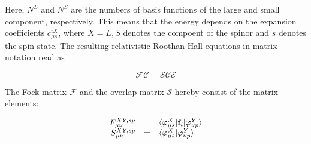 Here, $N^L$ and $N^S$ are the numbers of basis functions of the large and small
component, respectively. This means that the energy depends on the expansion
coefficients $c_{\mu s}^{iX}$, where $X=L,S$ denotes the compoent of the spinor and
$s$ denotes the spin state. The resulting relativistic Roothan-Hall equations
in matrix notation read as

\begin{equation}
\mathcal{FC} = \mathcal{SCE}
\end{equation}

The Fock matrix $\mathcal{F}$ and the overlap matrix $\mathcal{S}$
hereby consist of the matrix elements:

\begin{equation}\begin{array}{rcl}\label{roothanm}
F^{XY,sp}_{\mu\nu} &=& \braket{\varphi^X_{\mu s}|\mathbf{f}_i|\varphi_{\nu p}^Y}\\
S^{XY,sp}_{\mu\nu} &=& \braket{\varphi^X_{\mu s}|\varphi_{\nu p}^Y}
\end{array}\end{equation}




